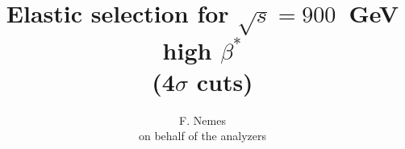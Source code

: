 \documentclass{beamer}
\title[TOTEM Physics Analysis meeting, 900 GeV high-$\beta^{*}$ for CNI analysis]{\scriptsize Elastic selection for $\sqrt{s}=900$~GeV high $\beta^{*}$\\ (4$\sigma$ cuts)}
\author{F. Nemes\\\vspace{1mm} \tiny on behalf of the analyzers}
\begin{document}
\begin{frame}
        \titlepage
\end{frame}
\end{document}
